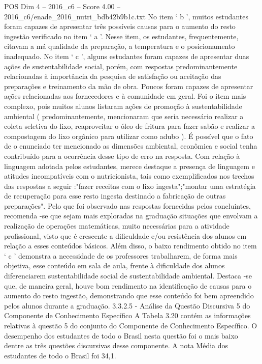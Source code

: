 \begin{textsample}{POS Dim 4 – 2016\_c6 – Score 4.00 – 2016\_c6/enade\_2016\_nutri\_bdb42b9b1c.txt}
No item ‘ b ’, muitos estudantes foram capazes de apresentar três possíveis causas para o aumento do resto ingestão verificado no item ‘ a ’.
Nesse item, os estudantes, frequentemente, citavam a má qualidade da preparação, a temperatura e o posicionamento inadequado.
No item ‘ c ’, alguns estudantes foram capazes de apresentar duas ações de sustentabilidade social, porém, com respostas predominantemente relacionadas à importância da pesquisa de satisfação ou aceitação das preparações e treinamento da mão de obra.
Poucos foram capazes de apresentar ações relacionadas aos fornecedores e à comunidade em geral.
Foi o item mais complexo, pois muitos alunos listaram ações de promoção à sustentabilidade ambiental ( predominantemente, mencionaram que seria necessário realizar a coleta seletiva do lixo, reaproveitar o óleo de fritura para fazer sabão e realizar a compostagem do lixo orgânico para utilizar como adubo ).
É possível que o fato de o enunciado ter mencionado as dimensões ambiental, econômica e social tenha contribuído para a ocorrência desse tipo de erro na resposta.
Com relação à linguagem adotada pelos estudantes, merece destaque a presença de linguagem e atitudes incompatíveis com o nutricionista, tais como exemplificados nos trechos das respostas a seguir :"fazer receitas com o lixo ingesta";"montar uma estratégia de recuperação para esse resto ingesta destinado a fabricação de outras preparações".
Pelo que foi observado nas respostas fornecidas pelos concluintes, recomenda -se que sejam mais exploradas na graduação situações que envolvam a realização de operações matemáticas, muito necessárias para a atividade profissional, visto que é crescente a dificuldade e/ou resistência dos alunos em relação a esses conteúdos básicos.
Além disso, o baixo rendimento obtido no item ‘ c ’ demonstra a necessidade de os professores trabalharem, de forma mais objetiva, esse conteúdo em sala de aula, frente à dificuldade dos alunos diferenciarem sustentabilidade social de sustentabilidade ambiental.
Destaca -se que, de maneira geral, houve bom rendimento na identificação de causas para o aumento do resto ingestão, demonstrando que esse conteúdo foi bem apreendido pelos alunos durante a graduação. 3.3.2.5 - Análise da Questão Discursiva 5 do Componente de Conhecimento Específico A Tabela 3.20 contém as informações relativas à questão 5 do conjunto do Componente de Conhecimento Específico.
O desempenho dos estudantes de todo o Brasil nesta questão foi o mais baixo dentre as três questões discursivas desse componente.
A nota Média dos estudantes de todo o Brasil foi 34,1.

\end{textsample}
